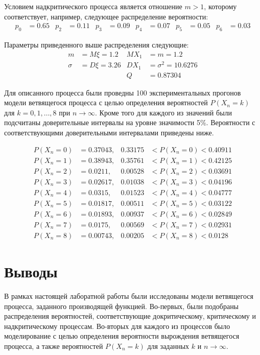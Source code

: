Условием надкритического процесса является отношение $m > 1$, которому соответствует, например, следующее распределение вероятности:
\begin{align*}
    p_0 & = 0.65 & p_2 & = 0.11 & p_3 & = 0.09 & p_4 & = 0.07 & p_5 & = 0.05 & p_6 & = 0.03
\end{align*}

Параметры приведенного выше распределения следующие:
\begin{align*}
    m & = M\xi = 1.2 & MX_1 & = m = 1.2\\
    \sigma & = D\xi = 3.26 & DX_1 & = \sigma^2 = 10.6276\\
    & & Q & = 0.87304
\end{align*}

Для описанного процесса были проведны 100 экспериментальных прогонов модели ветвящегося процесса с целью определения
вероятностей $P(X_n=k)$ для $k=0,1,\dots,8$ при $n\rightarrow\infty$.
Кроме того для каждого из значений были подсчитаны доверительные интервалы на уровне значимости 5\%.
Вероятности с соответствующими доверительными интервалами приведены ниже.

\begin{align*}
P(X_n = 0) & = 0.37043, & 0.33175 & < P(X_n = 0) < 0.40911\\
P(X_n = 1) & = 0.38943, & 0.35761 & < P(X_n = 1) < 0.42125\\
P(X_n = 2) & = 0.0211, & 0.00528 & < P(X_n = 2) < 0.03691\\
P(X_n = 3) & = 0.02617, & 0.01038 & < P(X_n = 3) < 0.04196\\
P(X_n = 4) & = 0.0315, & 0.01523 & < P(X_n = 4) < 0.04777\\
P(X_n = 5) & = 0.01817, & 0.00511 & < P(X_n = 5) < 0.03122\\
P(X_n = 6) & = 0.01893, & 0.00937 & < P(X_n = 6) < 0.02849\\
P(X_n = 7) & = 0.0175, & 0.00569 & < P(X_n = 7) < 0.02931\\
P(X_n = 8) & = 0.00743, & 0.00205 & < P(X_n = 8) < 0.0128
\end{align*}

\section*{Выводы}

В рамках настоящей лаборатной работы были исследованы модели ветвящегося процесса, заданного производящей функцией.
Во-первых, были подобраны распределения вероятностей, соответствующие докритическому, критическому и надкритическому процессам.
Во-вторых для каждого из процессов было моделирование с целью определения вероятности вырождения ветвящегося процесса,
а также вероятностей $P(X_n=k)$ для заданных $k$ и $n\rightarrow\infty$.

